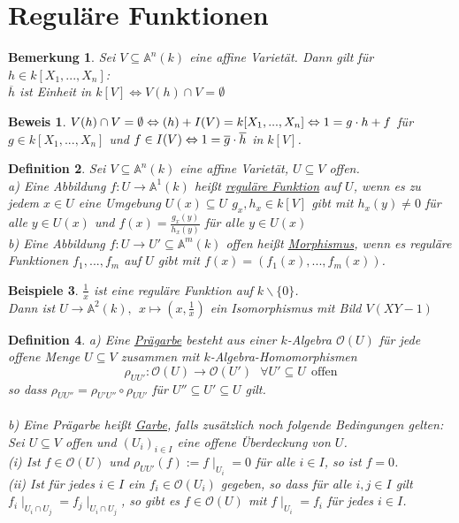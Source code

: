 \documentclass[a4paper,12pt]{report}
\theoremstyle{break}
\newtheorem{Def}{Definition}[section]
\newtheorem{Bem}[Def]{Bemerkung}
\newtheorem{Bsp}[Def]{Beispiele}
\theoremstyle{nonumberbreak}
\theoremstyle{nonumberplain}
\newtheorem{Bew}{Beweis}
\begin{document}
\section{Reguläre Funktionen}
\begin{Bem}
Sei $V\subseteq\mathbb{A}^n(k)$ eine affine Varietät. Dann gilt für $h\in k[X_1,...,X_n]$:\\
$\overline{h}$ ist Einheit in $k[V]\Leftrightarrow V(h)\cap V = \emptyset$
\end{Bem}
\begin{Bew} $V(h)\cap V = \emptyset \Leftrightarrow (h)+I(V)=k[X_1,...,X_n]\\
\Leftrightarrow1=g\cdot h+f$ für $g\in k[X_1,...,X_n]$ und $f\in I(V)\\
\Leftrightarrow 1= \overline{g}\cdot\overline{h}$ in $k[V]$.
\end{Bew}
\begin{Def}
\label{def:6.2}
Sei $V\subseteq\mathbb{A}^n(k)$ eine affine Varietät, $U\subseteq V$ offen.\\
a) Eine Abbildung $f: U\rightarrow \mathbb{A}^1(k)$ heißt \underline{reguläre Funktion} auf $U$, wenn es zu jedem $x\in U$ eine Umgebung $U(x)\subseteq U$
$g_x,h_x\in k[V]$ gibt mit $h_x(y)\neq0$ für alle $y\in U(x)$ und $f(x)=\frac{g_x(y)}{h_x(y)}$ für alle $y\in U(x)$\\
b) Eine Abbildung $f: U\rightarrow U'\subseteq \mathbb{A}^m(k)$ offen heißt \underline{Morphismus}, wenn es reguläre Funktionen $f_1,...,f_m$ auf $U$ gibt mit $f(x)=(f_1(x),...,f_m(x))$.
\end{Def}
\begin{Bsp} $\frac{1}{x}$ ist eine reguläre Funktion auf $k\backslash\{0\}$.\\
Dann ist $U\rightarrow \mathbb{A}^2(k), ~~x\mapsto(x,\frac{1}{x})$ ein Isomorphismus mit Bild $V(XY-1)$
\end{Bsp}
\begin{Def}
a) Eine \underline{Prägarbe} besteht aus einer $k$-Algebra $\mathcal{O}(U)$ für jede offene Menge $U\subseteq V$ zusammen mit $k$-Algebra-Homomorphismen
$$\rho_{UU'}: \mathcal{O}(U)\rightarrow \mathcal{O}(U') ~~~\forall U'\subseteq U~~\textrm{offen}$$
so dass $\rho_{UU''}=\rho_{U'U''}\circ\rho_{UU'}$ für $U''\subseteq U'\subseteq U$ gilt.\\\\
b) Eine Prägarbe heißt \underline{Garbe}, falls zusätzlich noch folgende Bedingungen gelten:\\
Sei $U\subseteq V$ offen und $(U_i)_{i\in I}$ eine offene Überdeckung von $U$.\\
(i) Ist $f\in \mathcal{O}(U)$ und $\rho_{UU'}(f):= f\mid_{U_i} = 0$ für alle $i\in I$, so ist $f=0$.\\
(ii) Ist für jedes $i\in I$ ein $f_i\in \mathcal{O}(U_i)$ gegeben, so dass für alle $i,j\in I$ gilt $f_i\mid_{U_i\cap U_j}=f_j\mid_{U_i\cap U_j}$, so gibt es $f\in \mathcal{O}(U)$ mit $f\mid_{U_i}=f_i$ für jedes $i\in I$.
\end{Def}
\end{document}
